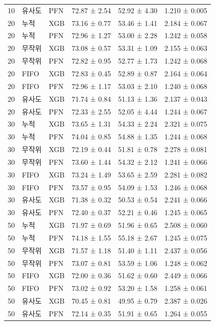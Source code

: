 \begin{longtable}
{}10 & 유사도 & PFN & 72.87 ± 2.54 & 52.92 ± 4.30 & 1.210 ± 0.005 \\
{}20 & 누적 & XGB & 73.16 ± 0.77 & 53.46 ± 1.41 & 2.184 ± 0.067 \\
{}20 & 누적 & PFN & 72.96 ± 1.27 & 53.00 ± 2.28 & 1.242 ± 0.058 \\
{}20 & 무작위 & XGB & 73.08 ± 0.57 & 53.31 ± 1.09 & 2.155 ± 0.063 \\
{}20 & 무작위 & PFN & 72.82 ± 0.95 & 52.77 ± 1.73 & 1.242 ± 0.068 \\
{}20 & FIFO & XGB & 72.83 ± 0.45 & 52.89 ± 0.87 & 2.164 ± 0.064 \\
{}20 & FIFO & PFN & 72.96 ± 1.17 & 53.03 ± 2.10 & 1.240 ± 0.068 \\
{}20 & 유사도 & XGB & 71.74 ± 0.84 & 51.13 ± 1.36 & 2.137 ± 0.043 \\
{}20 & 유사도 & PFN & 72.33 ± 2.55 & 52.05 ± 4.44 & 1.244 ± 0.067 \\
{}30 & 누적 & XGB & 73.65 ± 1.31 & 54.33 ± 2.24 & 2.321 ± 0.075 \\
{}30 & 누적 & PFN & 74.04 ± 0.85 & 54.88 ± 1.35 & 1.244 ± 0.068 \\
{}30 & 무작위 & XGB & 72.19 ± 0.44 & 51.81 ± 0.78 & 2.278 ± 0.081 \\
{}30 & 무작위 & PFN & 73.60 ± 1.44 & 54.32 ± 2.12 & 1.241 ± 0.066 \\
{}30 & FIFO & XGB & 73.24 ± 1.49 & 53.65 ± 2.59 & 2.281 ± 0.082 \\
{}30 & FIFO & PFN & 73.57 ± 0.95 & 54.09 ± 1.53 & 1.246 ± 0.068 \\
{}30 & 유사도 & XGB & 71.38 ± 0.32 & 50.53 ± 0.54 & 2.241 ± 0.066 \\
{}30 & 유사도 & PFN & 72.40 ± 0.37 & 52.21 ± 0.46 & 1.245 ± 0.065 \\
{}50 & 누적 & XGB & 71.97 ± 0.69 & 51.96 ± 0.65 & 2.508 ± 0.060 \\
{}50 & 누적 & PFN & 74.18 ± 1.55 & 55.18 ± 2.67 & 1.245 ± 0.075 \\
{}50 & 무작위 & XGB & 71.57 ± 1.18 & 51.40 ± 1.11 & 2.437 ± 0.056 \\
{}50 & 무작위 & PFN & 73.07 ± 0.81 & 53.59 ± 1.06 & 1.248 ± 0.062 \\
{}50 & FIFO & XGB & 72.00 ± 0.36 & 51.62 ± 0.60 & 2.449 ± 0.066 \\
{}50 & FIFO & PFN & 73.02 ± 0.92 & 53.20 ± 1.58 & 1.258 ± 0.061 \\
{}50 & 유사도 & XGB & 70.45 ± 0.81 & 49.95 ± 0.79 & 2.387 ± 0.026 \\
{}50 & 유사도 & PFN & 72.14 ± 0.35 & 51.91 ± 0.65 & 1.264 ± 0.055 \\

\end{longtable}
